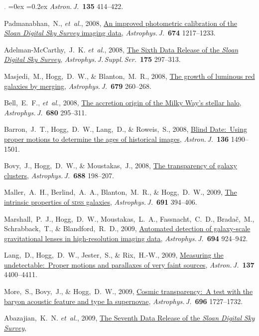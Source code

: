 \documentclass[12pt,letterpaper]{article}
\newcommand{\latin}[1]{\textsl{#1}}
\newcommand{\etal}{\latin{et~al.}}
\newcommand{\project}[1]{\textsl{#1}}
\newcommand{\doi}[2]{\href{http://dx.doi.org/#1}{{#2}}}
\newcommand{\deemph}[1]{\textcolor{grey}{\footnotesize{#1}}}
\newcommand{\pubnumber}[1]{\deemph{{#1}.}}
\newcounter{refpubnum}
\newcommand{\hogglist}{%
    \rightmargin=0in
    \leftmargin=0.18in
    \topsep=0ex
    \partopsep=0pt
    \itemsep=0.2ex
    \parsep=0pt
    \itemindent=-1.0\leftmargin
    \listparindent=0.0\leftmargin
    \settowidth{\labelsep}{~}
    \usecounter{refpubnum}
  }
\begin{document}
\begin{list}{\pubnumber{\therefpubnum}}{\hogglist}
\textit{Astron.\,J.}\ \textbf{135} 414--422.
\item
Padmanabhan,~N., \etal, 2008,
\doi{10.1086/524677}{An improved photometric calibration of the \project{Sloan Digital Sky Survey} imaging data},
\textit{Astrophys.\,J.}\ \textbf{674} 1217--1233.
\item
Adelman-McCarthy,~J.~K. \etal, 2008,
\doi{10.1086/524984}{The Sixth Data Release of the \project{Sloan Digital Sky Survey}},
\textit{Astrophys.\,J.\,Suppl.\,Ser.}\ \textbf{175} 297--313.
\item
Masjedi,~M., Hogg,~D.~W., \& Blanton,~M.~R., 2008,
\doi{10.1086/586696}{The growth of luminous red galaxies by merging},
\textit{Astrophys.\,J.}\ \textbf{679} 260--268.
\item
Bell,~E.~F., \etal, 2008,
\doi{10.1086/588032}{The accretion origin of the Milky Way's stellar halo},
\textit{Astrophys.\,J.}\ \textbf{680} 295--311.
\item
Barron,~J.~T., Hogg,~D.~W., Lang,~D., \& Roweis,~S., 2008,
\doi{10.1088/0004-6256/136/4/1490}{Blind Date:\ Using proper motions to determine the ages of historical images},
\textit{Astron.\,J.}\ \textbf{136} 1490--1501.
\item
Bovy,~J., Hogg,~D.~W., \& Moustakas,~J., 2008,
\doi{10.1086/592187}{The transparency of galaxy clusters},
\textit{Astrophys.\,J.}\ \textbf{688} 198--207.
\item
Maller,~A.~H., Berlind,~A.~A., Blanton,~M.~R., \& Hogg,~D.~W., 2009,
\doi{10.1088/0004-637X/691/1/394}{The intrinsic properties of \textsc{sdss} galaxies},
\textit{Astrophys.\,J.}\ \textbf{691} 394--406.
\item
Marshall,~P.~J., Hogg,~D.~W., Moustakas,~L.~A., Fassnacht,~C.~D.,
Brada\v{c},~M., Schrabback,~T., \& Blandford,~R.~D., 2009,
\doi{10.1088/0004-637X/694/2/924}{Automated detection of galaxy-scale gravitational lenses in high-resolution imaging data},
\textit{Astrophys.\,J.}\ \textbf{694} 924--942.
\item
Lang,~D., Hogg,~D.~W., Jester,~S., \& Rix,~H.-W., 2009,
\doi{10.1088/0004-6256/137/5/4400}{Measuring the undetectable:\ Proper motions and parallaxes of very faint sources},
\textit{Astron.\,J.}\ \textbf{137} 4400--4411.
\item
More,~S., Bovy,~J., \& Hogg,~D.~W., 2009,
\doi{10.1088/0004-637X/696/2/1727}{Cosmic transparency:\ A test with the baryon acoustic feature and type Ia supernovae},
\textit{Astrophys.\,J.}\ \textbf{696} 1727--1732.
\item
Abazajian,~K.~N. \etal, 2009,
\doi{10.1088/0067-0049/182/2/543}{The Seventh Data Release of the \project{Sloan Digital Sky Survey}},

\end{list}
\end{document}
